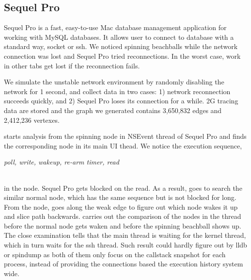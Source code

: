 \subsection{Sequel Pro}

Sequel Pro is a fast, easy-to-use Mac database management application for
working with MySQL databases. It allows user to connect to database with a
standard way, socket or ssh. We noticed spinning beachballs while the network
connection was lost and Sequel Pro tried reconnections. In the worst case, work
in other tabs get lost if the reconnection fails.

We simulate the unstable network environment by randomly disabling the network
for 1 second, and collect data in two cases: 1) network reconnection
succeeds quickly, and 2) Sequel Pro loses its connection for a while. 2G
tracing data are stored and the graph we generated contains 3,650,832 edges and
2,412,236 vertexes.

\xxx starts analysis from the spinning node in NSEvent thread of Sequel Pro and
finds the corresponding node in its main UI thead. We notice the execution
sequence,\\ \centerline{\textit{poll, write, wakeup, re-arm timer, read}} \\
in the node. Sequel Pro gets blocked on the read. As a result, \xxx goes to
search the similar normal node, which has the same sequence but is not blocked
for long. From the node, \xxx goes along the weak edge to figure out which node
wakes it up and slice path backwards. \xxx carries out the comparison of the
nodes in the thread before the normal node gets waken and before the spinning
beachball shows up. The close examination tells that the main thread is waiting
for the kernel thread, which in turn waits for the ssh thread. Such result
could hardly figure out by lldb or spindump as both of them only focus on the
callstack snapshot for each process, instead of providing the connections based
the execution history system wide.
